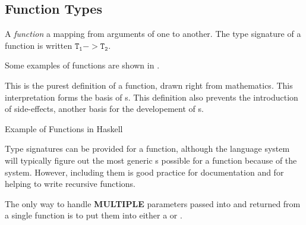 \subsection{Function Types}\label{subsec:Function_Types}
\begin{definition}[Function]\label{def:Function}
  A \emph{function} a mapping from arguments of one  to another.
  The type signature of a function is written $\mathtt{T_{1}} -> \mathtt{T_{2}}$.

  Some examples of functions are shown in .

  \begin{remark}\label{rmk:Function_Definition_Pureness}
    This is the purest definition of a function, drawn right from mathematics.
    This interpretation forms the basis of s.
    This definition also prevents the introduction of side-effects, another basis for the developement of s.
  \end{remark}
\end{definition}

\begin{listing}[h!tbp]
\caption{Example of Functions in Haskell}
\label{lst:Function_Examples}
\end{listing}

Type signatures can be provided for a function, although the language system will typically figure out the most generic s possible for a function because of the  system.
However, including them is good practice for documentation and for helping to write recursive functions.

\begin{blackbox}
  The only way to handle \textbf{MULTIPLE} parameters passed into and returned from a single function is to put them into either a  or .
\end{blackbox}

